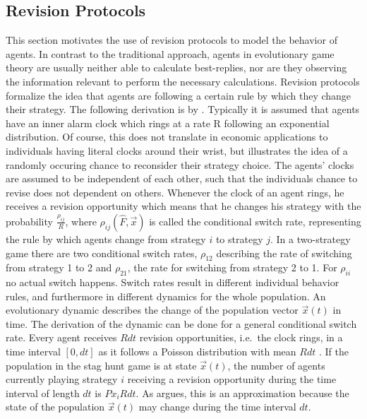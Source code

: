 \subsection{Revision Protocols}
\label{sec:revisionprotocols}
This section motivates the use of revision protocols to
model the behavior of agents.
In contrast to the traditional approach, agents in evolutionary game theory 
are usually neither able to calculate best-replies, 
nor are they observing the information relevant
to perform the necessary calculations.
Revision protocols formalize the idea that agents are following a certain
rule by which they change their strategy. 
The following derivation is by \textcite{sandholm_population_2010}. 
Typically it is assumed that agents have an inner alarm clock 
which rings at a rate R following an exponential distribution. 
Of course, this does not translate 
in economic applications to individuals having literal clocks around their
wrist, but illustrates the idea of a randomly occuring chance to reconsider
their strategy choice.
The agents' clocks are assumed to be independent of each other, such that
the individuals chance to revise does not dependent on others.
Whenever the clock of an agent rings, he
receives a revision opportunity which means that he changes his strategy
with the probability $\frac{\rho_{ij}}{R}$, where
$\rho_{ij}(\hat{F},\vec{x})$ is called the conditional switch rate,
representing the rule by which agents change from strategy 
$i$ to strategy $j$. 
In a two-strategy game there are two conditional switch rates, $\rho_{12}$ 
describing the rate of switching from strategy 1 to 2 and $\rho_{21}$, 
the rate for switching from strategy 2 to 1. For $\rho_{ii}$ no actual switch 
happens.
Switch rates result in different individual behavior rules, and furthermore 
in different dynamics for the whole population. An evolutionary
dynamic describes the change of the population vector $\vec{x}(t)$ in time. 
The derivation of the dynamic can be done for a general conditional switch 
rate. 
Every agent receives $R dt$ revision opportunities, i.e.\ the clock rings, 
in a time interval $[0,dt]$ as it follows a Poisson distribution with
mean $Rdt$ \parencite[123]{sandholm_population_2010}. 
If the population in the stag hunt game is at state $\vec{x}(t)$, the number 
of agents currently playing strategy $i$ receiving a revision opportunity 
during the time interval of length $dt$ is $Px_i R dt$. As 
\textcite{sandholm_population_2010} argues, this is an approximation because
the state of the population $\vec{x}(t)$ may change during the time interval $dt$.
